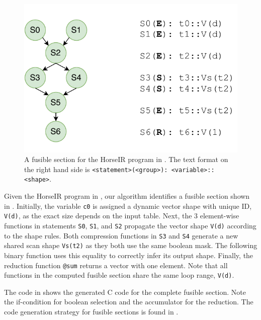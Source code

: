 \begin{figure}[htbp]
\centering
\includegraphics[width=.7\columnwidth]{./src/figure/graph-example.pdf}
\caption{A fusible section for the HorseIR program in . The
text format on the right hand side is \texttt{<statement>(<group>): <variable>::<shape>}.}
\label{fig:fusion_example}
\end{figure}

Given the HorseIR program in , our algorithm identifies a
fusible section shown in . Initially, the variable \texttt{c0}
is assigned a dynamic vector shape with unique ID, \texttt{V(d)}, as the exact size depends
on the input table. Next, the 3 element-wise functions in statements \texttt{S0},
\texttt{S1}, and \texttt{S2} propagate the vector shape \texttt{V(d)} according to the shape rules.
Both compression functions in \texttt{S3} and \texttt{S4} generate a new shared scan shape
\texttt{Vs(t2)} as they both use the same boolean mask. The following binary function
uses this equality to correctly infer its output shape. Finally, the reduction function
\texttt{@sum} returns a vector with one element. Note that all functions in the computed
fusible section share the same loop range, \texttt{V(d)}.

The code in  shows the generated C code for the complete
fusible section. Note the if-condition for boolean selection
and the accumulator for the reduction. The code generation strategy for fusible
sections is found in .


